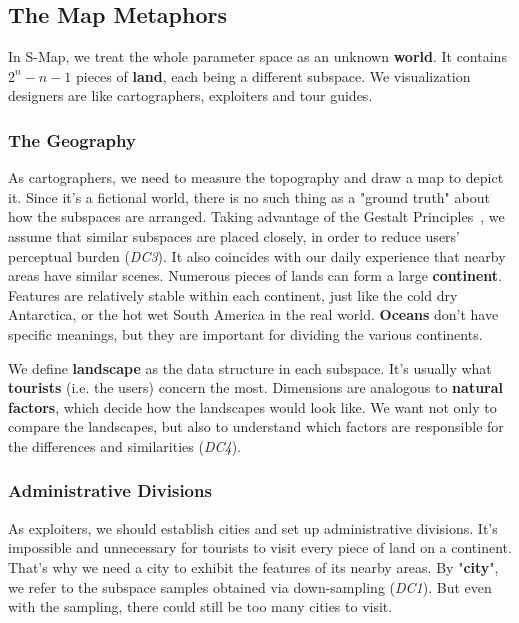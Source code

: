 \subsection{The Map Metaphors}

In S-Map, we treat the whole parameter space as an unknown \textbf{world}. It contains $2^n - n - 1$ pieces of \textbf{land}, each being a different subspace. We visualization designers are like cartographers, exploiters and tour guides. 

\subsubsection{The Geography}

As cartographers, we need to measure the topography and draw a map to depict it. Since it's a fictional world, there is no such thing as a "ground truth" about how the subspaces are arranged. Taking advantage of the Gestalt Principles~\cite{spelke1990principles}, we assume that similar subspaces are placed closely, in order to reduce users' perceptual burden (\textit{DC3}). It also coincides with our daily experience that nearby areas have similar scenes. Numerous pieces of lands can form a large \textbf{continent}. Features are relatively stable within each continent, just like the cold dry Antarctica, or the hot wet South America in the real world. \textbf{Oceans} don't have specific meanings, but they are important for dividing the various continents.

We define \textbf{landscape} as the data structure in each subspace. It's usually what \textbf{tourists} (i.e. the users) concern the most. Dimensions are analogous to \textbf{natural factors}, which decide how the landscapes would look like. We want not only to compare the landscapes, but also to understand which factors are responsible for the differences and similarities (\textit{DC4}). 

\subsubsection{Administrative Divisions}

As exploiters, we should establish cities and set up administrative divisions. It's impossible and unnecessary for tourists to visit every piece of land on a continent. That's why we need a city to exhibit the features of its nearby areas. By "\textbf{city}", we refer to the subspace samples obtained via down-sampling (\textit{DC1}).
But even with the sampling, there could still be too many cities to visit.

